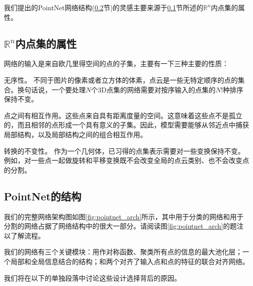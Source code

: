 我们提出的PointNet网络结构(\ref{sec:pointnet_arch}节)的灵感主要来源于\ref{sec:point_set_property}节所述的$\mathbb{R}^n$内点集的属性。 %

\subsection{$\mathbb{R}^n$内点集的属性}
\label{sec:point_set_property}
网络的输入是来自欧几里得空间的点的子集，主要有一下三种主要的性质：

\bitem
\item 无序性。
不同于图片的像素或者立方体的体素，点云是一些无特定顺序的点的集合。换句话说，一个要处理$N$个3D点集的网络需要对按序输入的点集的$N!$种排序保持不变。 
\item 点之间有相互作用。这些点来自具有距离度量的空间。这意味着这些点不是孤立的，而且相邻的点形成一个具有意义的子集。因此，模型需要能够从邻近点中捕获局部结构，以及局部结构之间的组合相互作用。 
\item 转换的不变性。
作为一个几何体，已习得的点集表示需要对一些变换保持不变。例如，对一些点一起做旋转和平移变换既不会改变全局的点云类别、也不会改变点的分割。
\eitem



\subsection{PointNet的结构}
\label{sec:pointnet_arch}

我们的完整网络架构图如图\ref{fig:pointnet_arch}所示，其中用于分类的网络和用于分割的网络占据了网络结构中的很大一部分。请阅读图\ref{fig:pointnet_arch}的题注以了解流程。

我们的网络有三个关键模块：用作对称函数、聚类所有点的信息的最大池化层；一个局部和全局信息结合的结构；和两个对齐了输入点和点的特征的联合对齐网络。

我们将在以下的单独段落中讨论这些设计选择背后的原因。%

